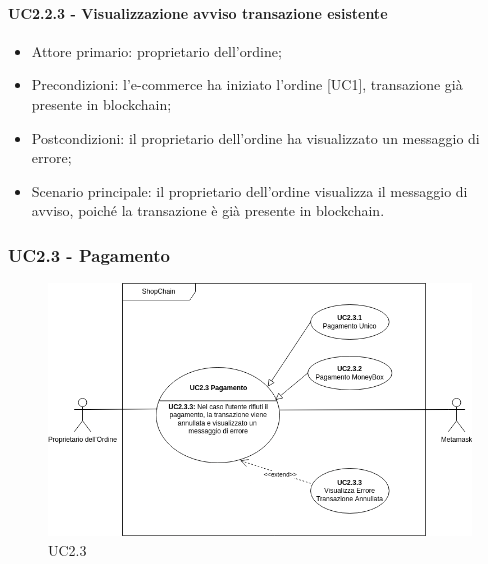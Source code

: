 \paragraph{UC2.2.3 - Visualizzazione avviso transazione esistente}

\begin{itemize}
    \item Attore primario: proprietario dell'ordine;
    \item Precondizioni: l'e-commerce\glo{} ha iniziato l'ordine [UC1], transazione già presente in blockchain;
    \item Postcondizioni: il proprietario dell'ordine ha visualizzato un messaggio di errore;
    \item Scenario principale: il proprietario dell'ordine visualizza il messaggio di avviso, poiché la transazione è già presente in blockchain\glo{}.
\end{itemize}

\subsubsection{UC2.3 - Pagamento}

\begin{figure}[H]
    \centering
    \includegraphics[scale=0.7]{immagini/UC2.3.png}
    \caption{UC2.3}
\end{figure}

